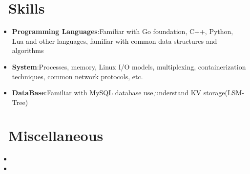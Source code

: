 \documentclass{resume}
\newcommand{\en}[1]{#1}
\newcommand{\zh}[1]{}
\begin{document}
\section{\faCogs\ \en{Skills}\zh{技能}}
\begin{itemize}[parsep=0.5ex]
      \item \en{\textbf{Programming Languages}:Familiar with Go foundation, C++, Python, Lua and other languages, familiar with common data structures and algorithms}
            \zh{\textbf{编程语言}: 熟悉 Go 基础,了解 C++、Python、Lua 等语言,熟悉常用数据结构与算法}
      \item \en{\textbf{System}:Processes, memory, Linux I/O models, multiplexing, containerization techniques, common network protocols, etc.}
            \zh{\textbf{系统}: 进程、内存、Linux I/O 模型、多路复用、容器化技术、常见网络协议等}
      \item \en{\textbf{DataBase}:Familiar with MySQL database use,understand KV storage(LSM-Tree)}
            \zh{\textbf{数据库}: 熟悉 MySQL 数据库使用,了解 KV 存储(LSM-Tree)}
\end{itemize}

\section{\faInfo\ \en{Miscellaneous}\zh{杂项}}
\begin{itemize}[parsep=0.5ex]
      \item \en{}
            \zh{喜欢折腾,搭建过 Gitea、Minio、Grafana 等服务}
      \item \en{}
            \zh{热爱写代码和了解有趣的知识,自己平常实现过一些小项目(手写Git,简单全文搜索引擎,简单 BitTorrent 下载器,Bot 工具,静态博客生成器,DNS 服务器等等)}

\end{itemize}
\end{document}
